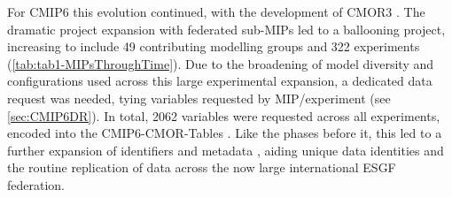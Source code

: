 \documentclass[gmd, preprint]{copernicus}
\begin{document}
For CMIP6 this evolution continued, with the development of CMOR3 \citep{mauzey_cmor_2024}. The dramatic project expansion with federated sub-MIPs led to a ballooning project, increasing to include 49 contributing modelling groups and 322 experiments (\autoref{tab:tab1-MIPsThroughTime}). Due to the broadening of model diversity and configurations used across this large experimental expansion, a dedicated data request was needed, tying variables requested by MIP/experiment (see \autoref{sec:CMIP6DR}). In total, 2062 variables were requested across all experiments, encoded into the CMIP6-CMOR-Tables \citep{nadeau_cmip6_2017}. Like the phases before it, this led to a further expansion of identifiers and metadata \citep{taylor_pcmdi_2018}, aiding unique data identities and the routine replication of data across the now large international ESGF federation.
\end{document}
